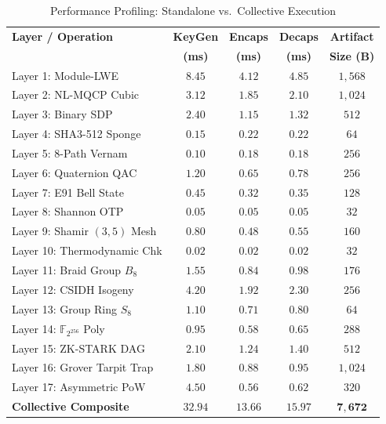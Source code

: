 \documentclass{ieeeaccess}
\newcommand{\F}{\mathbb{F}}
\begin{document}
\begin{table}[!t]
\centering
\caption{Performance Profiling: Standalone vs.\ Collective Execution}
\label{tab:benchmarks}
\renewcommand{\arraystretch}{1.15}
\setlength{\tabcolsep}{2.0pt}
\footnotesize
\begin{tabular}{@{}l c c c c@{}}
\toprule
\textbf{Layer / Operation} & \textbf{KeyGen} & \textbf{Encaps} & \textbf{Decaps} & \textbf{Artifact} \\
 & \textbf{(ms)} & \textbf{(ms)} & \textbf{(ms)} & \textbf{Size (B)} \\
\midrule
Layer 1: Module-LWE          & $8.45$  & $4.12$  & $4.85$  & $1{,}568$ \\
Layer 2: NL-MQCP Cubic       & $3.12$  & $1.85$  & $2.10$  & $1{,}024$ \\
Layer 3: Binary SDP          & $2.40$  & $1.15$  & $1.32$  & $512$ \\
Layer 4: SHA3-512 Sponge     & $0.15$  & $0.22$  & $0.22$  & $64$ \\
Layer 5: 8-Path Vernam       & $0.10$  & $0.18$  & $0.18$  & $256$ \\
Layer 6: Quaternion QAC      & $1.20$  & $0.65$  & $0.78$  & $256$ \\
Layer 7: E91 Bell State      & $0.45$  & $0.32$  & $0.35$  & $128$ \\
Layer 8: Shannon OTP         & $0.05$  & $0.05$  & $0.05$  & $32$ \\
Layer 9: Shamir $(3,5)$ Mesh & $0.80$  & $0.48$  & $0.55$  & $160$ \\
Layer 10: Thermodynamic Chk  & $0.02$  & $0.02$  & $0.02$  & $32$ \\
Layer 11: Braid Group $B_8$  & $1.55$  & $0.84$  & $0.98$  & $176$ \\
Layer 12: CSIDH Isogeny      & $4.20$  & $1.92$  & $2.30$  & $256$ \\
Layer 13: Group Ring $S_8$   & $1.10$  & $0.71$  & $0.80$  & $64$ \\
Layer 14: $\F_{2^{256}}$ Poly& $0.95$  & $0.58$  & $0.65$  & $288$ \\
Layer 15: ZK-STARK DAG       & $2.10$  & $1.24$  & $1.40$  & $512$ \\
Layer 16: Grover Tarpit Trap & $1.80$  & $0.88$  & $0.95$  & $1{,}024$ \\
Layer 17: Asymmetric PoW     & $4.50$  & $0.56$  & $0.62$  & $320$ \\
\midrule
\textbf{Collective Composite} & $\mathbf{32.94}$ & $\mathbf{13.66}$ & $\mathbf{15.97}$ & $\mathbf{7{,}672}$ \\
\bottomrule
\end{tabular}
\end{table}
\end{document}
